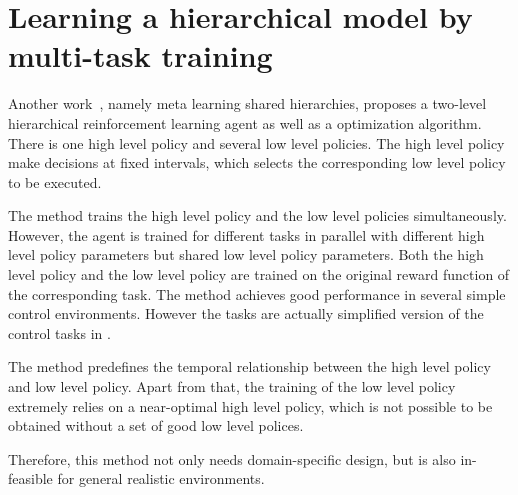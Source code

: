 \section{Learning a hierarchical model by multi-task training} 
Another work~\cite{frans2017meta}, namely meta learning shared hierarchies, proposes a two-level hierarchical reinforcement learning agent as well as a optimization algorithm. There is one high level policy and several low level policies. The high level policy make decisions at fixed intervals, which selects the corresponding low level policy to be executed. 

The method trains the high level policy and the low level policies simultaneously.  However, the agent is trained for different tasks in parallel with different high level policy parameters but shared low level policy parameters. Both the high level policy and the low level policy are trained on the original reward function of the corresponding task. The method achieves good performance in several simple control environments. However the tasks are actually simplified version of the control tasks in \cite{duan2016benchmarking}. 

The method predefines the temporal relationship between the high level policy and low level policy. Apart from that, the training of the low level policy extremely relies on a near-optimal high level policy, which is not possible to be obtained without a set of good low level polices.

Therefore, this method not only needs domain-specific design, but is also in-feasible for general realistic environments.



